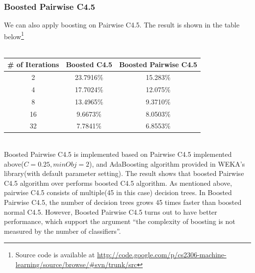 \documentclass[a4paper,11pt]{article}
\begin{document}
\subsubsection{Boosted Pairwise C4.5}
We can also apply boosting on Pairwise C4.5. The result is shown in the table below\footnote{Source code is available at \url{http://code.google.com/p/cs2306-machine-learning/source/browse/#svn/trunk/src}}\\
\vspace{0.5cm}\\
\begin{tabular}{c c c}
\# of Iterations	& Boosted C4.5 & Boosted Pairwise C4.5\\
\hline \hline
	2		& 23.7916\% & 15.283\%  \\
	4		& 17.7024\% & 12.075\%  \\
	8		& 13.4965\% & 9.3710\%  \\
	16		& 9.6673\%  & 8.0503\%  \\
    32      & 7.7841\%  & 6.8553\%\\
\end{tabular}
\vspace{0.5cm}\\
Boosted Pairwise C4.5 is implemented based on Pairwise C4.5 implemented above($C=0.25,minObj=2$), and AdaBoosting algorithm provided in WEKA's library(with default parameter setting). The result shows that boosted Pairwise C4.5 algorithm over performs boosted C4.5 algorithm. As mentioned above, pairwise C4.5 consists of multiple(45 in this case) decision trees. In Boosted Pairwise C4.5, the number of decision trees grows 45 times faster than boosted normal C4.5. However, Boosted Pairwise C4.5 turns out to have better performance, which support the argument ``the complexity of boosting is not measured by the number of classifiers''.
\end{document}
